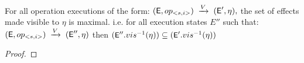 %
%
For all operation executions of the form: 
$({\normalfont \textsf{E}},op_{<s,i>}) 
    \;\xrightarrow{V}\;
  ({\normalfont \textsf{E}}',\eta) 
,$
the set of effects made visible to $\eta$ is maximal. i.e. for all
execution states $E''$ such that:
$({\normalfont \textsf{E}},op_{<s,i>})\;\xrightarrow{V}\;({\normalfont \textsf{E}}'',\eta)$
then    
$\small ({\normalfont \textsf{E}}''.vis^{-1}(\eta)) \subseteq
({\normalfont \textsf{E}}'.vis^{-1}(\eta))$
\begin{proof}

\end{proof}



